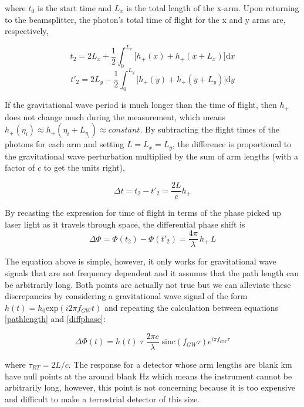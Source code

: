 	where $t_0$ is the start time and $L_x$ is the total length of the x-arm.  Upon returning to the beamsplitter, the photon's total time of flight for the x and y arms are, respectively,
	
	\begin{equation}
	t_2 = 2 L_x + \frac{1}{2} \int_{0}^{L_x} \bigg[  h_{+}(x) +  h_{+}(x + L_x)  \bigg] \text{d}x
	\end{equation}
	\begin{equation}
	t'_{2}= 2 L_y - \frac{1}{2} \int_{0}^{L_y} \bigg[  h_{+}(y) +  h_{+}(y + L_y)  \bigg] \text{d}y
	\end{equation}
	
	If the gravitational wave period is much longer than the time of flight, then $h_{+}$ does not change much during the measurement, which means $h_{+}(\eta_i) \approx h_{+}(\eta_i + L_{\eta_i}) \approx constant$.  By subtracting the flight times of the photons for each arm and setting $L = L_x = L_y$, the difference is proportional to the gravitational wave perturbation multiplied by the sum of arm lengths (with a factor of $c$ to get the units right),
	
	\begin{equation}
	\Delta t = t_2 - t'_{2} = \frac{2L}{c} h_{+}
	\end{equation}
	
	By recasting the expression for time of flight in terms of the phase picked up laser light as it travels through space, the differential phase shift is
	\begin{equation}\label{diffphase}
	\Delta \Phi = \Phi(t_{2}) - \Phi(t'_{2}) = \frac{4 \pi}{\lambda} \, h_{+} \, L
	\end{equation}
	
	The equation above is simple, however, it only works for gravitational wave signals that are not frequency dependent and it assumes that the path length can be arbitrarily long. Both points are actually not true but we can alleviate these discrepancies by considering a gravitational wave signal of the form $h(t) = h_0 \text{exp} (i 2 \pi f_{GW} t)$  and repeating the calculation between equations \ref{pathlength} and \ref{diffphase}:
	
	\begin{equation}\label{gwsinc}
	\Delta \Phi (t) = h(t) \; \tau \; \frac{2 \pi c}{\lambda} \; \text{sinc}(f_{GW} \tau) e^{i \pi f_{GW} \tau}
	\end{equation}
	
	where $\tau_{RT} = 2L/c$.  The response for a detector whose arm lengths are blank km have null points at the around blank Hz which means the instrument cannot be arbitrarily long, however, this point is not concerning because it is too expensive and difficult to make a terrestrial detector of this size.
	
